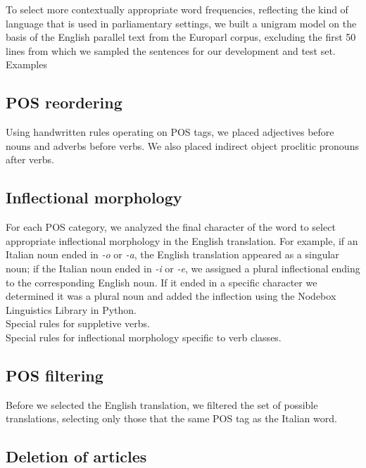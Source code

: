 \documentclass{article}
\begin{document}
To select more contextually appropriate word frequencies, reflecting the kind of language that is used in parliamentary settings, we built a unigram model on the basis of the English parallel text from the Europarl corpus, excluding the first 50 lines from which we sampled the sentences for our development and test set. \\

Examples
  
\subsection{POS reordering}

Using handwritten rules operating on POS tags, we placed adjectives before nouns and adverbs before verbs. We also placed indirect object proclitic pronouns after verbs.

\subsection{Inflectional morphology}

For each POS category, we analyzed the final character of the word to select appropriate inflectional morphology in the English translation. For example, if an Italian noun ended in \textit{-o} or \textit{-a}, the English translation appeared as a singular noun; if the Italian noun ended in \textit{-i} or \textit{-e}, we assigned a plural inflectional ending to the corresponding English noun. If it ended in a specific character we determined it was a plural noun and added the inflection using the Nodebox Linguistics Library in Python. \\

Special rules for suppletive verbs. \\

Special rules for inflectional morphology specific to verb classes.

\subsection{POS filtering}

Before we selected the English translation, we filtered the set of possible translations, selecting only those that the same POS tag as the Italian word.
 
\subsection{Deletion of articles}
\end{document}
